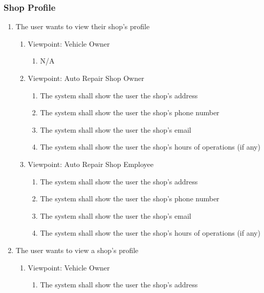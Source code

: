 \documentclass[12pt]{article}
\begin{document}
\subsubsection{Shop Profile}
\begin{enumerate}[resume*=business_events]
	\item The user wants to view their shop's profile
	      \begin{enumerate}[VP\arabic*.]
		      \item Viewpoint: Vehicle Owner
		            \begin{enumerate}
			            \item[] N/A
		            \end{enumerate}
		      \item Viewpoint: Auto Repair Shop Owner
		            \begin{enumerate}
			            \item The system shall show the user the shop's address
			            \item The system shall show the user the shop's phone number
			            \item The system shall show the user the shop's email
			            \item The system shall show the user the shop's hours of operations (if any)
		            \end{enumerate}
		      \item Viewpoint: Auto Repair Shop Employee
		            \begin{enumerate}
			            \item The system shall show the user the shop's address
			            \item The system shall show the user the shop's phone number
			            \item The system shall show the user the shop's email
			            \item The system shall show the user the shop's hours of operations (if any)
		            \end{enumerate}
	      \end{enumerate}
	\item The user wants to view a shop's profile
	      \begin{enumerate}[VP\arabic*.]
		      \item Viewpoint: Vehicle Owner
		            \begin{enumerate}
			            \item The system shall show the user the shop's address

\end{enumerate}
\end{enumerate}
\end{enumerate}
\end{document}
